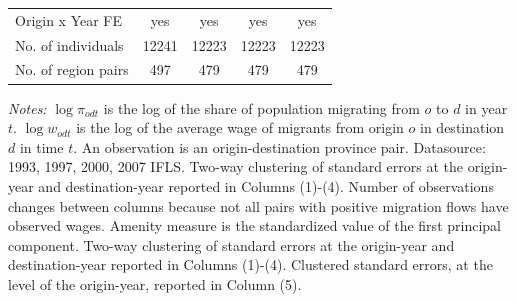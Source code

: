 \begin{table}
\begin{small}
\begin{center}
\begin{threeparttable}[b]
\begin{tabular}{l*{4}c}
Origin x Year FE    &         yes   &         yes   &         yes   &         yes   \\
No. of individuals  &       12241   &       12223   &       12223   &       12223   \\
No. of region pairs &         497   &         479   &         479   &         479   \\
\bottomrule \end{tabular} \label{} \begin{tablenotes} \item {\footnotesize \emph{Notes: } $\log \pi_{odt}$ is the log of the share of population migrating from $ o $ to $ d $ in year $ t $. $\log w_{odt}$ is the log of the average wage of migrants from origin $ o $ in destination $ d $ in time $ t $. An observation is an origin-destination province pair. Datasource: 1993, 1997, 2000, 2007 IFLS. Two-way clustering of standard errors at the origin-year and destination-year reported in Columns (1)-(4). Number of observations changes between columns because not all pairs with positive migration flows have observed wages. Amenity measure is the standardized value of the first principal component. Two-way clustering of standard errors at the origin-year and destination-year reported in Columns (1)-(4). Clustered standard errors, at the level of the origin-year, reported in Column (5). } \end{tablenotes} \end{threeparttable} \end{center} \end{small} \end{table}
